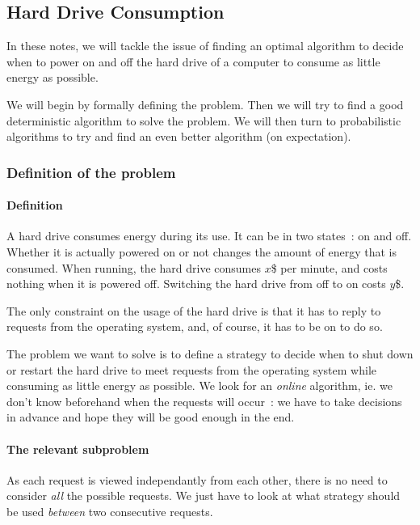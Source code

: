 \subsection{Hard Drive Consumption}

In these notes, we will tackle the issue of finding an optimal algorithm to decide when to power on and off the hard drive of a computer to consume as little energy as possible.

We will begin by formally defining the problem. Then we will try to find a good deterministic algorithm to solve the problem. We will then turn to probabilistic algorithms to try and find an even better algorithm (on expectation).

\subsubsection{Definition of the problem}

\paragraph{Definition}

A hard drive consumes energy during its use. It can be in two states~: on and off. Whether it is actually powered on or not changes the amount of energy that is consumed. When running, the hard drive consumes $x$\$ per minute, and costs nothing when it is powered off. Switching the hard drive from off to on costs $y$\$.

The only constraint on the usage of the hard drive is that it has to reply to requests from the operating system, and, of course, it has to be on to do so.

The problem we want to solve is to define a strategy to decide when to shut down or restart the hard drive to meet requests from the operating system while consuming as little energy as possible. We look for an \emph{online} algorithm, ie. we don't know beforehand when the requests will occur~: we have to take decisions in advance and hope they will be good enough in the end.

\paragraph{The relevant subproblem}

As each request is viewed independantly from each other, there is no need to consider \emph{all} the possible requests. We just have to look at what strategy should be used \emph{between} two consecutive requests.

